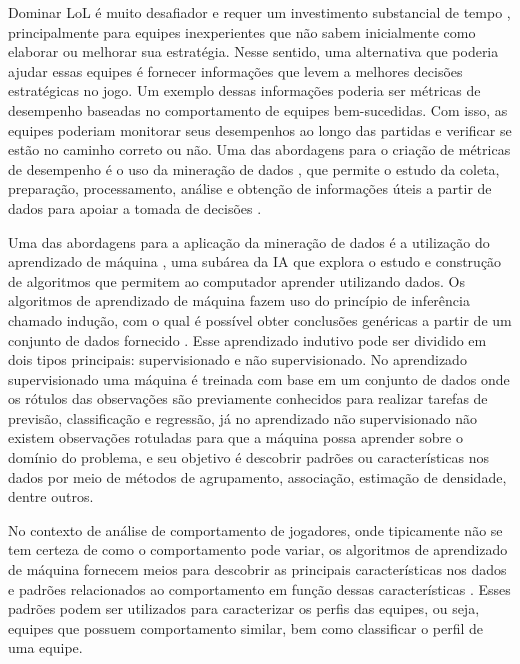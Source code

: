 Dominar LoL é muito desafiador e requer um investimento substancial de tempo \cite{drachen2014skill}, principalmente para equipes inexperientes que não sabem inicialmente como elaborar ou melhorar sua estratégia. Nesse sentido, uma alternativa que poderia ajudar essas equipes é fornecer informações que levem a melhores decisões estratégicas no jogo. Um exemplo dessas informações poderia ser métricas de desempenho baseadas no comportamento de equipes bem-sucedidas. Com isso, as equipes poderiam monitorar seus desempenhos ao longo das partidas e verificar se estão no caminho correto ou não. Uma das abordagens para o criação de métricas de desempenho é o uso da mineração de dados \cite{el2016game}, que permite o estudo da coleta, preparação, processamento, análise e obtenção de informações úteis a partir de dados para apoiar a tomada de decisões \cite{aggarwal2015data}.

Uma das abordagens para a aplicação da mineração de dados é a utilização do aprendizado de máquina \cite{aggarwal2015data}, uma subárea da IA que explora o estudo e construção de algoritmos que permitem ao computador aprender utilizando dados. Os algoritmos de aprendizado de máquina fazem uso do princípio de inferência chamado indução, com o qual é possível obter conclusões genéricas a partir de um conjunto de dados fornecido \cite{lorena2007introduccao}. Esse aprendizado indutivo pode ser dividido em dois tipos principais: supervisionado e não supervisionado. No aprendizado supervisionado uma máquina é treinada com base em um conjunto de dados onde os rótulos das observações são previamente conhecidos para realizar tarefas de previsão, classificação e regressão, já no aprendizado não supervisionado não existem observações rotuladas para que a máquina possa aprender sobre o domínio do problema, e seu objetivo é descobrir padrões ou características nos dados \cite{sathya2013comparison} por meio de métodos de agrupamento, associação, estimação de densidade, dentre outros.

No contexto de análise de comportamento de jogadores, onde tipicamente não se tem certeza de como o comportamento pode variar, os algoritmos de aprendizado de máquina fornecem meios para descobrir as principais características nos dados e padrões relacionados ao comportamento em função dessas características \cite{el2016game}. Esses padrões podem ser utilizados para caracterizar os perfis das equipes, ou seja, equipes que possuem comportamento similar, bem como classificar o perfil de uma equipe.

